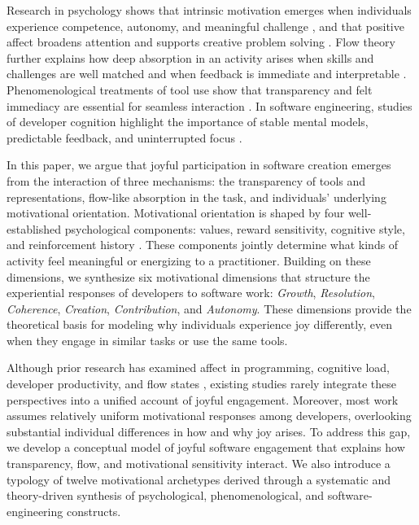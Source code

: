 \documentclass[12pt]{elsarticle}
\begin{document}
Research in psychology shows that intrinsic motivation emerges when individuals 
experience competence, autonomy, and meaningful challenge \cite{ryan2000selfdetermination, deci1985intrinsic}, and that positive affect broadens attention and 
supports creative problem solving \cite{fredrickson2001broaden}. Flow theory 
further explains how deep absorption in an activity arises when skills and 
challenges are well matched and when feedback is immediate and interpretable 
\cite{csikszentmihalyi1990flow}. Phenomenological treatments of tool use show 
that transparency and felt immediacy are essential for seamless interaction 
\cite{heidegger1996being, ihde1990technology}. In software engineering, studies 
of developer cognition highlight the importance of stable mental models, 
predictable feedback, and uninterrupted focus \cite{soloway2009empirical, parnin2011programmer}.

\medskip
In this paper, we argue that joyful participation in software creation emerges 
from the interaction of three mechanisms:  the transparency of tools and 
representations, flow-like absorption in the task, and individuals' underlying 
motivational orientation. Motivational orientation is shaped by four 
well-established psychological components: values, reward sensitivity, 
cognitive style, and reinforcement history \cite{gray1987personality, messick1976personality}. These components jointly determine 
what kinds of activity feel meaningful or energizing to a practitioner. Building 
on these dimensions, we synthesize six motivational dimensions that structure the 
experiential responses of developers to software work: \emph{Growth}, 
\emph{Resolution}, \emph{Coherence}, \emph{Creation}, \emph{Contribution}, and 
\emph{Autonomy}. These dimensions provide the theoretical basis for modeling why 
individuals experience joy differently, even when they engage in similar tasks 
or use the same tools.

Although prior research has examined affect in programming, cognitive load, 
developer productivity, and flow states \cite{graziotin2014happy, ford2015exploring, csikszentmihalyi1990flow, parnin2011programmer}, existing studies rarely 
integrate these perspectives into a unified account of joyful engagement. 
Moreover, most work assumes relatively uniform motivational responses among 
developers, overlooking substantial individual differences in how and why joy 
arises. To address this gap, we develop a conceptual model of joyful software 
engagement that explains how transparency, flow, and motivational sensitivity 
interact. We also introduce a typology of twelve motivational archetypes 
derived through a systematic and theory-driven synthesis of psychological, 
phenomenological, and software-engineering constructs.
\end{document}
